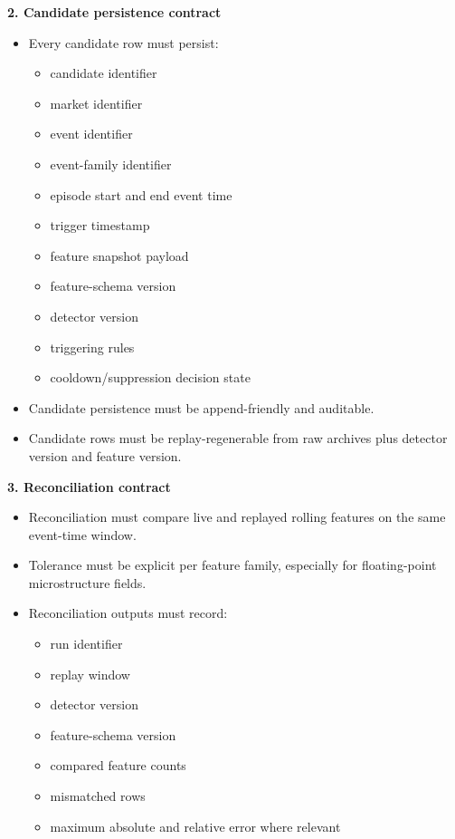 \documentclass{article}
\begin{document}
\textbf{2. Candidate persistence contract}
\begin{itemize}
\item Every candidate row must persist:
\begin{itemize}
\item candidate identifier
\item market identifier
\item event identifier
\item event-family identifier
\item episode start and end event time
\item trigger timestamp
\item feature snapshot payload
\item feature-schema version
\item detector version
\item triggering rules
\item cooldown/suppression decision state
\end{itemize}
\item Candidate persistence must be append-friendly and auditable.
\item Candidate rows must be replay-regenerable from raw archives plus detector version and feature version.
\end{itemize}

\textbf{3. Reconciliation contract}
\begin{itemize}
\item Reconciliation must compare live and replayed rolling features on the same event-time window.
\item Tolerance must be explicit per feature family, especially for floating-point microstructure fields.
\item Reconciliation outputs must record:
\begin{itemize}
\item run identifier
\item replay window
\item detector version
\item feature-schema version
\item compared feature counts
\item mismatched rows
\item maximum absolute and relative error where relevant
\end{itemize}
\end{itemize}
\end{document}
